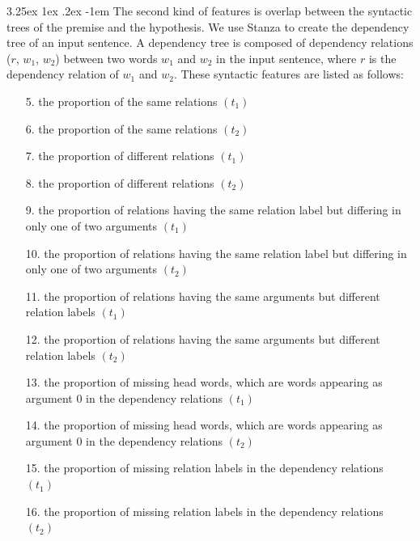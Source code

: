 \documentclass[12pt]{article}
\makeatletter
\newcounter{subsubsubsection}[subsubsection]
\renewcommand\paragraph{\@startsection{paragraph}{5}{\z@}%
  {3.25ex \@plus1ex \@minus.2ex}%
  {-1em}%
  {\normalfont\normalsize\bfseries}}
\makeatother
\begin{document}
\begin{CJK*}{UTF8}{bkai}
\begin{spacing}{1.77}
\paragraph{}
The second kind of features is overlap between the syntactic trees of the premise and the hypothesis. We use Stanza \cite{qi2020stanza} to create the dependency tree of an input sentence. A dependency tree is composed of dependency relations ($r$, $w_1$, $w_2$) between two words $w_1$ and $w_2$ in the input sentence, where $r$ is the dependency relation of $w_1$ and $w_2$. These syntactic features are listed as follows:

\begin{enumerate}
    \item[ 5.] the proportion of the same relations $(t_1)$
    \item[ 6.] the proportion of the same relations $(t_2)$
    \item[ 7.] the proportion of different relations $(t_1)$
    \item[ 8.] the proportion of different relations $(t_2)$
    \item[ 9.] the proportion of relations having the same relation label but differing in only one of two arguments $(t_1)$
    \item[10.] the proportion of relations having the same relation label but differing in only one of two arguments $(t_2)$
    \item[11.] the proportion of relations having the same arguments but different relation labels $(t_1)$
    \item[12.] the proportion of relations having the same arguments but different relation labels $(t_2)$
    \item[13.] the proportion of missing head words, which are words appearing as argument 0 in the dependency relations $(t_1)$
    \item[14.] the proportion of missing head words, which are words appearing as argument 0 in the dependency relations $(t_2)$
    \item[15.] the proportion of missing relation labels in the dependency relations $(t_1)$
    \item[16.] the proportion of missing relation labels in the dependency relations $(t_2)$
\end{enumerate}



\end{spacing}
\end{CJK*}
\end{document}

